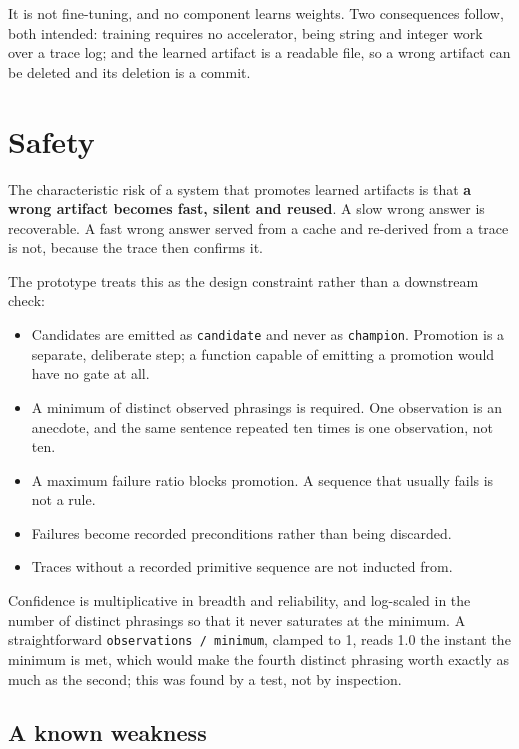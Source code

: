 \documentclass[11pt,twocolumn]{article}
\begin{document}
It is not fine-tuning, and no component learns weights. Two consequences follow,
both intended: training requires no accelerator, being string and integer work
over a trace log; and the learned artifact is a readable file, so a wrong
artifact can be deleted and its deletion is a commit.

\section{Safety}
\label{sec:safety}

The characteristic risk of a system that promotes learned artifacts is that
\textbf{a wrong artifact becomes fast, silent and reused}. A slow wrong answer
is recoverable. A fast wrong answer served from a cache and re-derived from a
trace is not, because the trace then confirms it.

The prototype treats this as the design constraint rather than a downstream
check:

\begin{itemize}
\item Candidates are emitted as \texttt{candidate} and never as
      \texttt{champion}. Promotion is a separate, deliberate step; a function
      capable of emitting a promotion would have no gate at all.
\item A minimum of distinct observed phrasings is required. One observation is
      an anecdote, and the same sentence repeated ten times is one observation,
      not ten.
\item A maximum failure ratio blocks promotion. A sequence that usually fails is
      not a rule.
\item Failures become recorded preconditions rather than being discarded.
\item Traces without a recorded primitive sequence are not inducted from.
\end{itemize}

Confidence is multiplicative in breadth and reliability, and log-scaled in the
number of distinct phrasings so that it never saturates at the minimum. A
straightforward \texttt{observations / minimum}, clamped to 1, reads 1.0 the
instant the minimum is met, which would make the fourth distinct phrasing worth
exactly as much as the second; this was found by a test, not by inspection.

\subsection{A known weakness}
\end{document}
